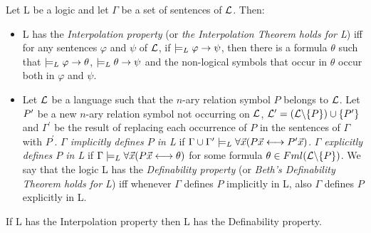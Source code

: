 \begin{defn}
Let L be a logic and let $\Gamma$ be a set of sentences of $\mathcal{L}$. Then:
\begin{itemize}   
\item L has the \textit{Interpolation property} (or \textit{the Interpolation Theorem holds for L}) iff for any sentences $\varphi$ and $\psi$ of $\mathcal{L}$,  if $\models_{L} \varphi \rightarrow\psi$, then there is a formula $\theta$ such that $\models_{L} \varphi \rightarrow \theta$, $\models_{L} \theta \rightarrow \psi$ and the non-logical symbols that occur in $\theta$ occur both in $\varphi$ and $\psi$.    
\item Let $\mathcal{L}$ be a language such that the $n$-ary relation symbol $P$ belongs to $\mathcal{L}$. Let $P^{\prime}$ be a new $n$-ary relation symbol not occurring on $\mathcal{L}$, $\mathcal{L}^{\prime} = (\mathcal{L} \backslash \{P\}) \cup \{P^{\prime}\}$ and $\Gamma^{\prime}$ be the result of replacing each occurrence of $P$ in the sentences of $\Gamma$ with $P^{\prime}$. \textit{$\Gamma$ implicitly defines $P$ in L} if $\Gamma \cup \Gamma^{\prime} \models_{L} \forall \vec{x}(P\vec{x} \longleftrightarrow P^{\prime}\vec{x})$. \textit{$\Gamma$ explicitly defines $P$ in L} if $\Gamma \models_{L} \forall \vec{x}(P\vec{x} \longleftrightarrow \theta)$ for some formula $\theta \in Fml(\mathcal{L} \backslash \{P\})$. We say that the logic L has the \textit{Definability property} (or \textit{Beth's Definability Theorem holds for L}) iff whenever $\Gamma$ defines $P$ implicitly in L, also $\Gamma$ defines $P$ explicitly in L.
\end{itemize}
\end{defn}


 
\begin{pro}
If L has the Interpolation property then L has the Definability property.
\end{pro}

